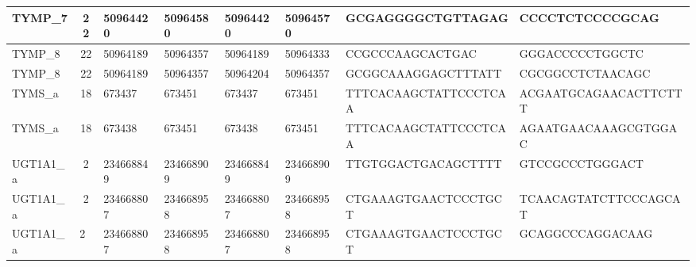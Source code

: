 \begin{landscape}
\begin{longtable}{| p{} | p{} | p{} | p{} | p{} | p{} | p{} | p{} |}
\multicolumn{1}{|l|}{TYMP\_7}    & \multicolumn{1}{c|}{22} & \multicolumn{1}{l|}{50964420}  & \multicolumn{1}{l|}{50964580}  & \multicolumn{1}{l|}{50964420}  & \multicolumn{1}{l|}{50964570}  & \multicolumn{1}{l|}{GCGAGGGGCTGTTAGAG}               & \multicolumn{1}{l|}{CCCCTCTCCCCGCAG}               \\ \hline
\multicolumn{1}{|l|}{TYMP\_8}    & \multicolumn{1}{c|}{22} & \multicolumn{1}{l|}{50964189}  & \multicolumn{1}{l|}{50964357}  & \multicolumn{1}{l|}{50964189}  & \multicolumn{1}{l|}{50964333}  & \multicolumn{1}{l|}{CCGCCCAAGCACTGAC}                & \multicolumn{1}{l|}{GGGACCCCCTGGCTC}               \\ \hline
\multicolumn{1}{|l|}{TYMP\_8}    & \multicolumn{1}{c|}{22} & \multicolumn{1}{l|}{50964189}  & \multicolumn{1}{l|}{50964357}  & \multicolumn{1}{l|}{50964204}  & \multicolumn{1}{l|}{50964357}  & \multicolumn{1}{l|}{GCGGCAAAGGAGCTTTATT}             & \multicolumn{1}{l|}{CGCGGCCTCTAACAGC}              \\ \hline
\multicolumn{1}{|l|}{TYMS\_a}    & \multicolumn{1}{c|}{18} & \multicolumn{1}{l|}{673437}    & \multicolumn{1}{l|}{673451}    & \multicolumn{1}{l|}{673437}    & \multicolumn{1}{l|}{673451}    & \multicolumn{1}{l|}{TTTCACAAGCTATTCCCTCAA}           & \multicolumn{1}{l|}{ACGAATGCAGAACACTTCTTT}         \\ \hline
\multicolumn{1}{|l|}{TYMS\_a}    & \multicolumn{1}{c|}{18} & \multicolumn{1}{l|}{673438}    & \multicolumn{1}{l|}{673451}    & \multicolumn{1}{l|}{673438}    & \multicolumn{1}{l|}{673451}    & \multicolumn{1}{l|}{TTTCACAAGCTATTCCCTCAA}           & \multicolumn{1}{l|}{AGAATGAACAAAGCGTGGAC}          \\ \hline
\multicolumn{1}{|l|}{UGT1A1\_a}  & \multicolumn{1}{c|}{2}  & \multicolumn{1}{l|}{234668849} & \multicolumn{1}{l|}{234668909} & \multicolumn{1}{l|}{234668849} & \multicolumn{1}{l|}{234668909} & \multicolumn{1}{l|}{TTGTGGACTGACAGCTTTT}             & \multicolumn{1}{l|}{GTCCGCCCTGGGACT}               \\ \hline
\multicolumn{1}{|l|}{UGT1A1\_a}  & \multicolumn{1}{c|}{2}  & \multicolumn{1}{l|}{234668807} & \multicolumn{1}{l|}{234668958} & \multicolumn{1}{l|}{234668807} & \multicolumn{1}{l|}{234668958} & \multicolumn{1}{l|}{CTGAAAGTGAACTCCCTGCT}            & \multicolumn{1}{l|}{TCAACAGTATCTTCCCAGCAT}         \\ \hline
UGT1A1\_a                        & 2                       & 234668807                      & 234668958                      & 234668807                      & 234668958                      & CTGAAAGTGAACTCCCTGCT                                 & GCAGGCCCAGGACAAG                                   \\ \hline
\end{longtable}
\end{landscape}

